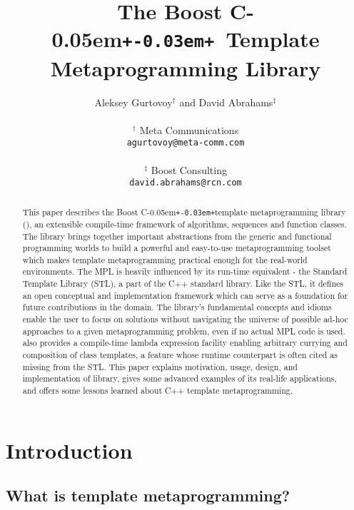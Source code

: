 \documentclass{netobjectdays}
\newcommand{\Cpp}{C\kern-0.05em\texttt{+\kern-0.03em+}}
\newcommand{\mpl}{\code{boost::mpl}}
\begin{document}
\title{The Boost \Cpp\ Template Metaprogramming Library}

\author{Aleksey Gurtovoy$^\dag$ and David Abrahams$^\ddag$ \\
\\
$^\dag$ Meta Communications \\
\texttt{agurtovoy@meta-comm.com}\\
\\
$^\ddag$ Boost Consulting \\
\texttt{david.abrahams@rcn.com}
}

\maketitle

\begin{abstract} $\!$This paper describes the Boost \Cpp template
metaprogramming library (\mpl), an extensible compile-time framework
of algorithms, sequences and function classes. The library brings
together important abstractions from the generic and functional
programming worlds to build a powerful and easy-to-use
metaprogramming toolset which makes template metaprogramming practical
enough for the real-world environments. The MPL is heavily influenced
by its run-time equivalent - the Standard Template Library (STL), a
part of the C++ standard library. Like the STL, it defines an open
conceptual and implementation framework which can serve as a
foundation for future contributions in the domain. The library's
fundamental concepts and idioms enable the user to focus on solutions 
without navigating the universe of possible ad-hoc approaches to a 
given metaprogramming problem, even if no actual MPL code is used. 
{\mpl} also provides a compile-time lambda expression facility enabling
arbitrary currying and composition of class templates, a feature whose
runtime counterpart is often cited as missing from the STL. This paper
explains motivation, usage, design, and implementation of \mpl 
library, gives some advanced examples of its real-life applications, 
and offers some lessons learned about C++ template metaprogramming.
\end{abstract}


\section{Introduction}
\subsection{What is template metaprogramming? }
\end{document}
